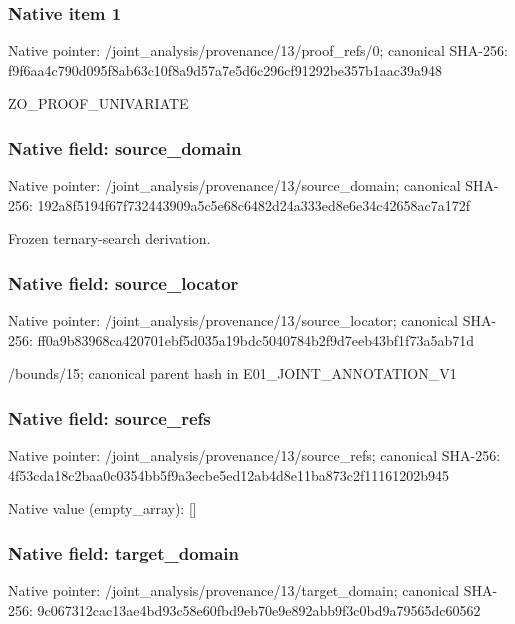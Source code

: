 \documentclass[10pt,a4paper]{article}
\begin{document}
\subsubsection{Native item 1}
Native pointer: /joint\_\allowbreak{}analysis/provenance/13/proof\_\allowbreak{}refs/0; canonical SHA-256: f9f6aa4c790d095f8ab63c10f8a9d57a7e5d6c296cf91292be357b1aac39a948

\begingroup\raggedright\sloppy ZO\_\allowbreak{}PROOF\_\allowbreak{}UNIVARIATE\par\endgroup

\subsubsection{Native field: source\_\allowbreak{}domain}
Native pointer: /joint\_\allowbreak{}analysis/provenance/13/source\_\allowbreak{}domain; canonical SHA-256: 192a8f5194f67f732443909a5c5e68c6482d24a333ed8e6e34c42658ac7a172f

\begingroup\raggedright\sloppy Frozen ternary-search derivation.\par\endgroup

\subsubsection{Native field: source\_\allowbreak{}locator}
Native pointer: /joint\_\allowbreak{}analysis/provenance/13/source\_\allowbreak{}locator; canonical SHA-256: ff0a9b83968ca420701ebf5d035a19bdc5040784b2f9d7eeb43bf1f73a5ab71d

\begingroup\raggedright\sloppy /\allowbreak{}bounds/\allowbreak{}15;\allowbreak{} canonical parent hash in E01\_\allowbreak{}JOINT\_\allowbreak{}ANNOTATION\_\allowbreak{}V1\par\endgroup

\subsubsection{Native field: source\_\allowbreak{}refs}
Native pointer: /joint\_\allowbreak{}analysis/provenance/13/source\_\allowbreak{}refs; canonical SHA-256: 4f53cda18c2baa0c0354bb5f9a3ecbe5ed12ab4d8e11ba873c2f11161202b945

Native value (empty\_\allowbreak{}array): []

\subsubsection{Native field: target\_\allowbreak{}domain}
Native pointer: /joint\_\allowbreak{}analysis/provenance/13/target\_\allowbreak{}domain; canonical SHA-256: 9c067312cac13ae4bd93c58e60fbd9eb70e9e892abb9f3c0bd9a79565dc60562
\end{document}
